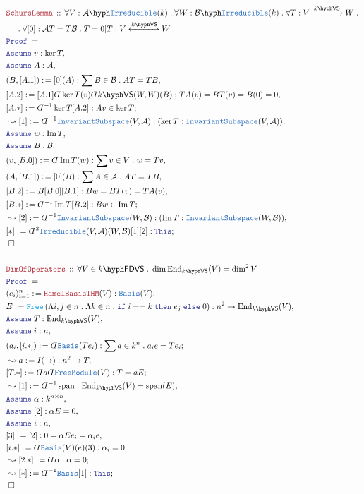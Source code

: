 \documentclass[12pt]{scrartcl}%
\newcommand{\TYPE}[1]{\textcolor{NavyBlue}{\mathtt{#1}}}%
\newcommand{\FUNC}[1]{\textcolor{Cerulean}{\mathtt{#1}}}%
\newcommand{\LOGIC}[1]{\textcolor{Blue}{\mathtt{#1}}}%
\newcommand{\THM}[1]{\textcolor{Maroon}{\mathtt{#1}}}%
\renewcommand{\.}{\; . \;} %
\newcommand{\de}{: \kern 0.1pc =} %
\newcommand{\If}{\LOGIC{if} \;} %
\newcommand{\Then}{ \; \LOGIC{then} \;} %
\newcommand{\Else}{\; \LOGIC{else} \;} %
\newcommand{\Theorem}[2]{& \THM{#1} \, :: \, #2 \\ & \Proof = \\ } %
\newcommand{\NewLine}{\\ & \kern 1pc}%
\newcommand{\Page}[1]{ \begin{align*} #1 \end{align*}  }%
\newcommand{ \bd }{ \ByDef }%
\DeclareMathOperator*{\im}{Im}%
\newcommand{\End}{\mathrm{End}}%
\newcommand{\Say}[3]{& #1 \de #2 : #3, \\} %
\newcommand{\Conclude}[3]{& #1 \de #2 : #3; \\}%
\newcommand{\Derive}[3]{& \leadsto #1 \de #2 : #3, \\} %
\newcommand{\DeriveConclude}[3]{& \leadsto #1 \de #2 : #3 ; \\} %
\newcommand{\Assume}[2]{& \LOGIC{Assume} \; #1 : #2, \\} %
\newcommand{\QED}{\; \square} %
\newcommand{\EndProof}{& \QED \\} %
\newcommand{\ByDef}{\rotatebox[origin=c]{-180}{$D$}}%
\newcommand{\Proof}{\LOGIC{Proof} \; } %
\newcommand{\Arrow}[1]{\xrightarrow{#1}}%
\newcommand{\ToIso}[1]{\xleftrightarrow{#1}}%
\newcommand{\A}{\mathcal{A}}
\newcommand{\B}{\mathcal{B}}
\newcommand{\Basis}{\TYPE{Basis}} %
\newcommand{\FM}{\TYPE{FreeModule}}
\newcommand{\IS}{\TYPE{InvariantSubspace}}
\DeclareMathOperator{\Span}{span} %
\newcommand{\VS}[1]{#1\hyph\mathsf{VS}} %
\newcommand{\FDVS}[1]{#1\hyph\mathsf{FDVS}} %
\begin{document}
\Page{
	\Theorem{SchursLemma}{\forall V : \A\hyph\TYPE{Irreducible}(k) \. \forall W : \B\hyph\TYPE{Irreducible}(k) \. 
		\forall T : V \Arrow{\VS{k}} W \.  \NewLine \. \forall [0] :  \A T = T \B \. T = 0 | T : V \ToIso{\VS{k}} W}
	\Assume{v}{\ker T}
	\Assume{A}{\A}
	\Say{(B,[A.1])}{[0](A)}{\sum B \in \B \. AT = TB}
	\Say{[A.2]}{[A.1]\bd \ker T(v) \bd \VS{k}(W,W)(B)}{TA(v) = BT(v) = B(0) = 0}
	\Conclude{[A.*]}{\bd^{-1} \ker T [A.2]}{Av \in \ker T}
	\Derive{[1]}{\bd^{-1} \IS(V,\A)}{(\ker T : \IS(V,\A))}
	\Assume{w}{\im T}
	\Assume{B}{\B}
	\Say{(v,[B.0])}{\bd \im T (w)}{\sum v \in V \. w = Tv}
	\Say{(A,[B.1])}{[0](B)}{\sum A \in \A \. AT = TB}
	\Say{[B.2]}{B[B.0][B.1]}{ Bw = BT(v) = TA(v)}
	\Conclude{[B.*]}{\bd^{-1}\im T[B.2]}{Bw \in \im T}
	\Derive{[2]}{\bd^{-1} \IS(W,\B)}{(\im T : \IS(W,\B))}
	\Conclude{[*]}{\bd^2 \TYPE{Irreducible}(V,\A)(W,\B)[1][2]}{\LOGIC{This}}
	\EndProof
	\\
	\Theorem{DimOfOperators}{  
		\forall V \in \FDVS{k} \. 
		\dim \End_{\VS{k}}(V) = \dim^2 V
	}
	\Say{(e_i)^n_{i=1}}{\THM{HamelBasisTHM}(V)}{\Basis(V)}
	\Say{E}{\FUNC{Free}\left(\Lambda i,j \in n \. \Lambda k \in n \. \If i == k \Then e_j \Else 0\right)}{n^2 \to \End_{\VS{k}}(V)}
	\Assume{T}{\End_{\VS{k}}(V)}
	\Assume{i}{n}
	\Conclude{(a_i,[i.*])}{ \bd \Basis(Te_i)}{\sum a \in k^n \. a_ie = Te_i}
	\Derive{a}{I(\to)}{ n^2 \to T }
	\Conclude{[T.*]}{\bd a \bd \FM(V)}{T = aE} 
	\Derive{[1]}{ \bd^{-1} \Span}{ \End_{\VS{k}}(V) = \Span(E)}
	\Assume{\alpha}{k^{n\times n}}
	\Assume{[2]}{\alpha E = 0}
	\Assume{i}{n}
	\Say{[3]}{[2]}{ 0 = \alpha Ee_i = \alpha_ie}
	\Conclude{[i.*]}{\bd \Basis(V)(e)(3)}{ \alpha_i = 0}
	\DeriveConclude{[2.*]}{\bd \alpha}{\alpha = 0}
	\DeriveConclude{[*]}{\bd^{-1}\Basis [1]}{\LOGIC{This}}
	\EndProof
}
\newpage
\end{document}
